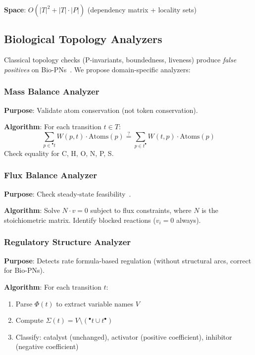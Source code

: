 \documentclass{article}
\newcommand{\preset}[1]{\ensuremath{{}^{\bullet}#1}}
\newcommand{\postset}[1]{\ensuremath{#1^{\bullet}}}
\newcommand{\RegSet}[1]{\ensuremath{\Sigma(#1)}}
\begin{document}
\textbf{Space}: $O(|T|^2 + |T| \cdot |P|)$ (dependency matrix + locality sets)

\subsection{Biological Topology Analyzers}

Classical topology checks (P-invariants, boundedness, liveness) produce \emph{false positives} on Bio-PNs~\cite{Chaouiya2007}. We propose domain-specific analyzers:

\subsubsection{Mass Balance Analyzer}

\textbf{Purpose}: Validate atom conservation (not token conservation).

\textbf{Algorithm}: For each transition $t \in T$:
\begin{equation}
\sum_{p \in \preset{t}} W(p,t) \cdot \text{Atoms}(p) \stackrel{?}{=} \sum_{p \in \postset{t}} W(t,p) \cdot \text{Atoms}(p)
\end{equation}
Check equality for C, H, O, N, P, S.

\subsubsection{Flux Balance Analyzer}

\textbf{Purpose}: Check steady-state feasibility~\cite{Orth2010}.

\textbf{Algorithm}: Solve $N \cdot v = 0$ subject to flux constraints, where $N$ is the stoichiometric matrix. Identify blocked reactions ($v_i = 0$ always).

\subsubsection{Regulatory Structure Analyzer}

\textbf{Purpose}: Detects rate formula-based regulation (without structural arcs, correct for Bio-PNs).

\textbf{Algorithm}: For each transition $t$:
\begin{enumerate}
    \item Parse $\Phi(t)$ to extract variable names $V$
    \item Compute $\RegSet{t} = V \setminus (\preset{t} \cup \postset{t})$
    \item Classify: catalyst (unchanged), activator (positive coefficient), inhibitor (negative coefficient)
\end{enumerate}
\end{document}
